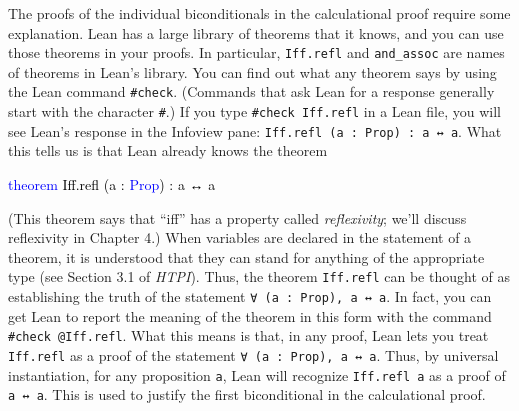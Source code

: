 \documentclass[
  letterpaper,
  DIV=11,
  numbers=noendperiod]{scrreprt}
\newenvironment{Shaded}{\begin{snugshade}}{\end{snugshade}}
\newcommand{\KeywordTok}[1]{\textcolor[rgb]{0.00,0.23,0.31}{#1}}
\newcommand{\NormalTok}[1]{\textcolor[rgb]{0.00,0.23,0.31}{#1}}
\renewcommand{\NormalTok}[1]{\textcolor[HTML]{000000}{#1}}
\renewcommand{\KeywordTok}[1]{\textcolor[HTML]{0000FF}{#1}}
\theoremstyle{remark}
\begin{document}
The proofs of the individual biconditionals in the calculational proof
require some explanation. Lean has a large library of theorems that it
knows, and you can use those theorems in your proofs. In particular,
\texttt{Iff.refl} and \texttt{and\_assoc} are names of theorems in
Lean's library. You can find out what any theorem says by using the Lean
command \texttt{\#check}. (Commands that ask Lean for a response
generally start with the character \texttt{\#}.) If you type
\texttt{\#check\ Iff.refl} in a Lean file, you will see Lean's response
in the Infoview pane: \texttt{Iff.refl\ (a\ :\ Prop)\ :\ a\ ↔\ a}. What
this tells us is that Lean already knows the theorem

\begin{Shaded}
\begin{Highlighting}[]
\KeywordTok{theorem}\NormalTok{ Iff.refl (a : }\KeywordTok{Prop}\NormalTok{) : a ↔ a}
\end{Highlighting}
\end{Shaded}

(This theorem says that ``iff'' has a property called
\emph{reflexivity}; we'll discuss reflexivity in Chapter 4.) When
variables are declared in the statement of a theorem, it is understood
that they can stand for anything of the appropriate type (see Section
3.1 of \emph{HTPI}). Thus, the theorem \texttt{Iff.refl} can be thought
of as establishing the truth of the statement
\texttt{∀\ (a\ :\ Prop),\ a\ ↔\ a}. In fact, you can get Lean to report
the meaning of the theorem in this form with the command
\texttt{\#check\ @Iff.refl}. What this means is that, in any proof, Lean
lets you treat \texttt{Iff.refl} as a proof of the statement
\texttt{∀\ (a\ :\ Prop),\ a\ ↔\ a}. Thus, by universal instantiation,
for any proposition \texttt{a}, Lean will recognize \texttt{Iff.refl\ a}
as a proof of \texttt{a\ ↔\ a}. This is used to justify the first
biconditional in the calculational proof.
\end{document}
